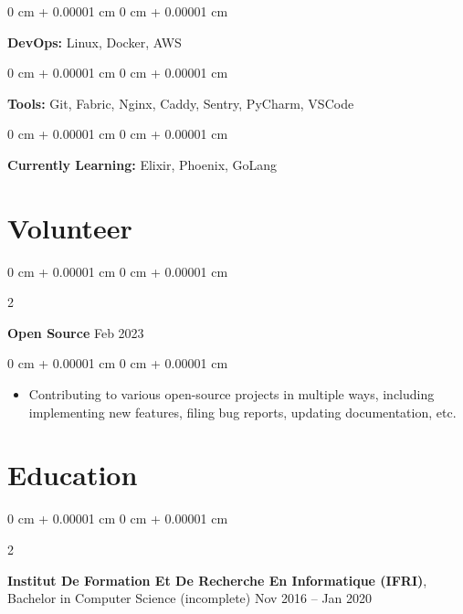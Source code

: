 \documentclass[10pt, letterpaper]{article}
\newenvironment{highlights}{
    \begin{itemize}[
        topsep=0.10 cm,
        parsep=0.10 cm,
        partopsep=0pt,
        itemsep=0pt,
        leftmargin=0 cm + 10pt
    ]
}{
    \end{itemize}
} %
\newenvironment{onecolentry}{
    \begin{adjustwidth}{
        0 cm + 0.00001 cm
    }{
        0 cm + 0.00001 cm
    }
}{
    \end{adjustwidth}
} %
\newenvironment{twocolentry}[2][]{
    \onecolentry
    \def\secondColumn{#2}
    \setcolumnwidth{\fill, 4.5 cm}
    \begin{paracol}{2}
}{
    \switchcolumn \raggedleft \secondColumn
    \end{paracol}
    \endonecolentry
} %
\begin{document}
        \begin{onecolentry}
            \textbf{DevOps:} Linux, Docker, AWS
        \end{onecolentry}

        \vspace{0.2 cm}

        \begin{onecolentry}
            \textbf{Tools:} Git, Fabric, Nginx, Caddy, Sentry, PyCharm, VSCode
        \end{onecolentry}

        \vspace{0.2 cm}

        \begin{onecolentry}
            \textbf{Currently Learning:} Elixir, Phoenix, GoLang
        \end{onecolentry}


    
    \section{Volunteer}



        
        \begin{twocolentry}{
            Feb 2023
        }
            \textbf{Open Source}\end{twocolentry}

        \vspace{0.10 cm}
        \begin{onecolentry}
            \begin{highlights}
                \item Contributing to various open-source projects in multiple ways, including implementing new features, filing bug reports, updating documentation, etc.
            \end{highlights}
        \end{onecolentry}



    
    \section{Education}



        
        \begin{twocolentry}{
            Nov 2016 – Jan 2020
        }
            \textbf{Institut De Formation Et De Recherche En Informatique (IFRI)}, Bachelor in Computer Science (incomplete)\end{twocolentry}
\end{document}
